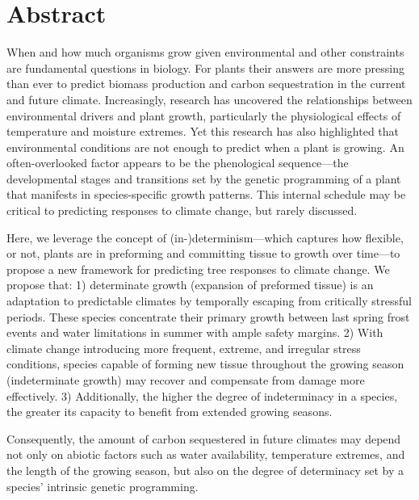 \documentclass{article}
\begin{document}
\section*{Abstract} %
	When and how much organisms grow given environmental and other constraints are fundamental questions in biology. For plants their answers are more pressing than ever to predict biomass production and carbon sequestration in the current and future climate. Increasingly, research has uncovered the relationships between environmental drivers and plant growth, particularly the physiological effects of temperature and moisture extremes. Yet this research has also highlighted that environmental conditions are not enough to predict when a plant is growing. An often-overlooked factor appears to be the phenological sequence---the developmental stages and transitions set by the genetic programming of a plant that manifests in species-specific growth patterns. This internal schedule may be critical to predicting responses to climate change, but rarely discussed. 
	
	Here, we leverage the concept of (in-)determinism---which captures how flexible, or not, plants are in preforming and committing tissue to growth over time---to propose a new framework for predicting tree responses to climate change. We propose that: 1) determinate growth (expansion of preformed tissue) is an adaptation to predictable climates by temporally escaping from critically stressful periods. These species concentrate their primary growth between last spring frost events and water limitations in summer with ample safety margins. 2) With climate change introducing more frequent, extreme, and irregular stress conditions, species capable of forming new tissue throughout the growing season (indeterminate growth) may recover and compensate from damage more effectively. 3) Additionally, the higher the degree of indeterminacy in a species, the greater its capacity to benefit from extended growing seasons. 
	
	Consequently, the amount of carbon sequestered in future climates may depend not only on abiotic factors such as water availability, temperature extremes, and the length of the growing season, but also on the degree of determinacy set by a species' intrinsic genetic programming.\\
		
\end{document}
